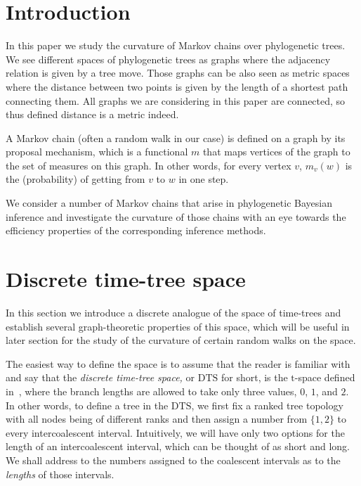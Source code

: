 \documentclass{amsart}
\newcommand{\dts}{\mathrm{DTS}}
\begin{document}
\section{Introduction}

In this paper we study the curvature of Markov chains over phylogenetic trees. 
We see different spaces of phylogenetic trees as graphs where the adjacency 
relation is given by a tree move. Those graphs can be also seen as metric 
spaces where the distance between two points is given by the length of a
shortest path connecting them. All graphs we are considering in this paper are
connected, so thus defined distance is a metric indeed. 

A Markov chain (often a random walk in our case) is defined on a graph by its
proposal mechanism, which is a functional $m$ that maps vertices of the graph to
the set of measures on this graph. In other words, for every vertex $v$, 
$m_v(w)$ is the (probability) of getting from $v$ to $w$ in one step. 

We consider a number of Markov chains that arise 
in phylogenetic Bayesian 
inference and investigate the curvature of those chains with an eye towards 
the efficiency properties of the corresponding inference methods. 

\section{Discrete time-tree space}

In this section we introduce a discrete analogue of the space of time-trees
and establish several graph-theoretic properties of this space, which will
be useful in later section for the study of the curvature of certain random
walks on the space. 

The easiest way to define the space is to assume that the reader is familiar 
with~\cite{Gavryushkin2014-bw} and say that the 
{\em discrete time-tree space,}
or $\dts$ for short, is the $\mathrm t$-space defined 
in~\cite{Gavryushkin2014-bw}, where the
branch lengths are allowed to take only three values, $0$, $1$, and $2$. 
In other words, to define a tree in the $\dts$, we first fix a ranked tree 
topology with all nodes being of different ranks and then assign a number
from $\{1,2\}$ to every intercoalescent interval. Intuitively, we will have
only two options for the length of an intercoalescent interval, which can
be thought of as short 
and long. 
We shall address to the numbers assigned to the coalescent intervals as to
the {\em lengths} of those intervals. 
\end{document}
